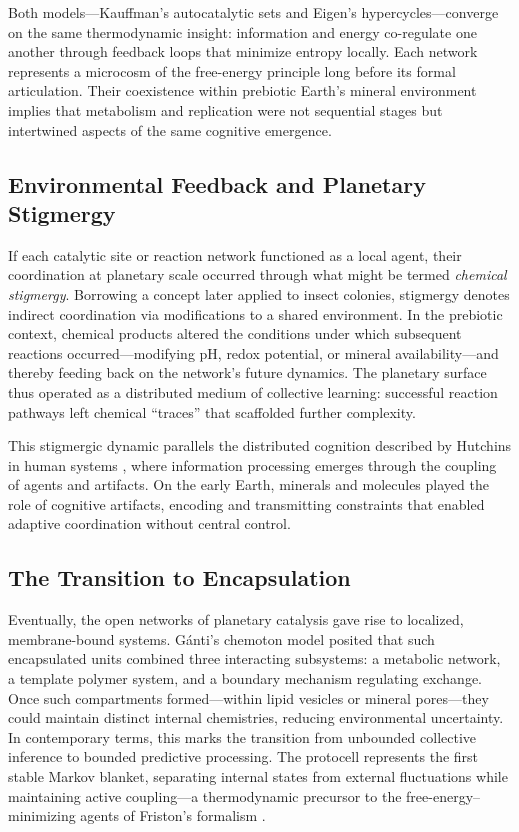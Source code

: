 \documentclass[11pt,a4paper]{article}
\begin{document}
Both models—Kauffman’s autocatalytic sets and Eigen’s hypercycles—converge on the same thermodynamic insight: information and energy co-regulate one another through feedback loops that minimize entropy locally.  Each network represents a microcosm of the free-energy principle long before its formal articulation.  Their coexistence within prebiotic Earth’s mineral environment implies that metabolism and replication were not sequential stages but intertwined aspects of the same cognitive emergence.

\subsection{Environmental Feedback and Planetary Stigmergy}

If each catalytic site or reaction network functioned as a local agent, their coordination at planetary scale occurred through what might be termed \emph{chemical stigmergy}.  Borrowing a concept later applied to insect colonies, stigmergy denotes indirect coordination via modifications to a shared environment.  In the prebiotic context, chemical products altered the conditions under which subsequent reactions occurred—modifying pH, redox potential, or mineral availability—and thereby feeding back on the network’s future dynamics.  The planetary surface thus operated as a distributed medium of collective learning: successful reaction pathways left chemical “traces” that scaffolded further complexity.

This stigmergic dynamic parallels the distributed cognition described by Hutchins in human systems \citep{Hutchins1995CognitionInTheWild}, where information processing emerges through the coupling of agents and artifacts.  On the early Earth, minerals and molecules played the role of cognitive artifacts, encoding and transmitting constraints that enabled adaptive coordination without central control.

\subsection{The Transition to Encapsulation}

Eventually, the open networks of planetary catalysis gave rise to localized, membrane-bound systems.  Gánti’s chemoton model \citep{Ganti2003Chemoton} posited that such encapsulated units combined three interacting subsystems: a metabolic network, a template polymer system, and a boundary mechanism regulating exchange.  Once such compartments formed—within lipid vesicles or mineral pores—they could maintain distinct internal chemistries, reducing environmental uncertainty.  In contemporary terms, this marks the transition from unbounded collective inference to bounded predictive processing.  The protocell represents the first stable Markov blanket, separating internal states from external fluctuations while maintaining active coupling—a thermodynamic precursor to the free-energy–minimizing agents of Friston’s formalism \citep{Friston2010FreeEnergyPrinciple}.
\end{document}
